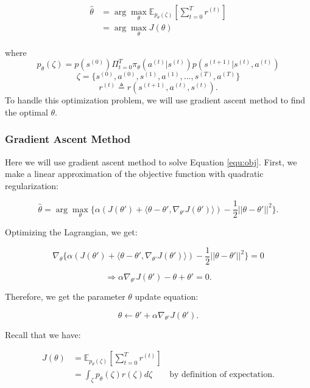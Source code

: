\documentclass[11pt]{article}
\begin{document}
\begin{equation}
\begin{split}
\hat{\theta} &= \arg \max_{\theta} \mathbb{E}_{p_\theta(\zeta)}[\sum_{t=0}^T r^{(t)}]\\
&= \arg \max_{\theta} J(\theta)
\end{split}
\label{equ:obj}
\end{equation}

where
$$p_\theta(\zeta) = p(s^{(0)}) \Pi_{t=0}^T \pi_\theta(a^{(t)}|s^{(t)})p(s^{(t+1)}|s^{(t)},a^{(t)})$$
$$\zeta = \{s^{(0)}, a^{(0)}, s^{(1)}, a^{(1)}, ..., s^{(T)}, a^{(T)}\} $$
$$r^{(t)} \triangleq r(s^{(t+1)},a^{(t)},s^{(t)}).$$
To handle this optimization problem, we will use gradient ascent method to find the optimal $\theta$.

\subsubsection{Gradient Ascent Method}

Here we will use gradient ascent method to solve Equation \ref{equ:obj}. First, we make a linear approximation of the objective function with quadratic regularization:

$$\hat{\theta} = \arg \max_{\theta}\{\alpha(J(\theta')+ \langle\theta-\theta', \nabla_{\theta'} J(\theta') \rangle) - \frac{1}{2}||\theta-\theta'||^2 \}.$$

Optimizing the Lagrangian, we get:

$$\nabla_{\theta} \{ \alpha(J(\theta')+ \langle\theta-\theta', \nabla_{\theta'} J(\theta') \rangle) - \frac{1}{2}||\theta-\theta'||^2 \} = 0$$

$$\Rightarrow \alpha \nabla_{\theta'}J(\theta')-\theta+\theta'=0.$$

Therefore, we get the parameter $\theta$ update equation:

\begin{equation}
\theta \leftarrow \theta' + \alpha \nabla_{\theta'} J(\theta'). 
\label{equ:update_theta}
\end{equation}

Recall that we have:

\begin{equation*}
\begin{split}
J(\theta) &= \mathbb{E}_{p_\theta(\zeta)}[\sum_{t=0}^T r^{(t)}] \\
&= \int_\zeta p_\theta(\zeta)r(\zeta) d\zeta \qquad \text{by definition of expectation.}
\end{split}
\end{equation*}
\end{document}
